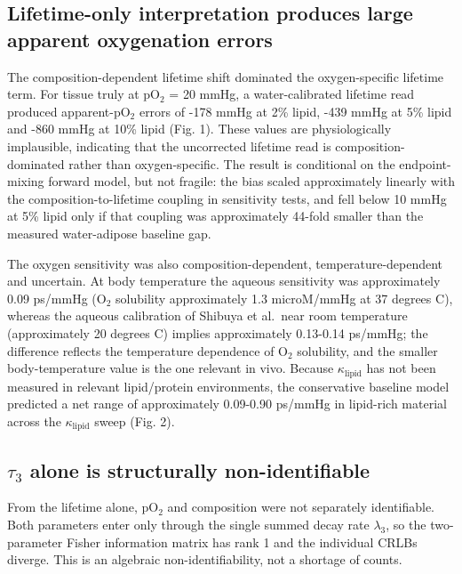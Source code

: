 \documentclass[pdflatex,sn-mathphys-num]{sn-jnl}
\begin{document}
\subsection{Lifetime-only interpretation produces large apparent oxygenation errors}\label{lifetime-only-interpretation-produces-large-apparent-oxygenation-errors}

The composition-dependent lifetime shift dominated the oxygen-specific lifetime term. For tissue truly at pO\(_2\) = 20 mmHg, a water-calibrated lifetime read produced apparent-pO\(_2\) errors of -178 mmHg at 2\% lipid, -439 mmHg at 5\% lipid and -860 mmHg at 10\% lipid (Fig. 1). These values are physiologically implausible, indicating that the uncorrected lifetime read is composition-dominated rather than oxygen-specific. The result is conditional on the endpoint-mixing forward model, but not fragile: the bias scaled approximately linearly with the composition-to-lifetime coupling in sensitivity tests, and fell below 10 mmHg at 5\% lipid only if that coupling was approximately 44-fold smaller than the measured water-adipose baseline gap.

The oxygen sensitivity was also composition-dependent, temperature-dependent and uncertain. At body temperature the aqueous sensitivity was approximately 0.09 ps/mmHg (O\(_2\) solubility approximately 1.3 microM/mmHg at 37 degrees C), whereas the aqueous calibration of Shibuya et al.~near room temperature (approximately 20 degrees C) implies approximately 0.13-0.14 ps/mmHg; the difference reflects the temperature dependence of O\(_2\) solubility, and the smaller body-temperature value is the one relevant in vivo. Because \(\kappa_{\mathrm{lipid}}\) has not been measured in relevant lipid/protein environments, the conservative baseline model predicted a net range of approximately 0.09-0.90 ps/mmHg in lipid-rich material across the \(\kappa_{\mathrm{lipid}}\) sweep (Fig. 2).

\subsection[ tau3 alone is structurally non-identifiable]{\texorpdfstring{$\tau_3$}{tau3} alone is structurally non-identifiable}\label{tau_3-alone-is-structurally-non-identifiable}

From the lifetime alone, pO\(_2\) and composition were not separately identifiable. Both parameters enter only through the single summed decay rate \(\lambda_3\), so the two-parameter Fisher information matrix has rank 1 and the individual CRLBs diverge. This is an algebraic non-identifiability, not a shortage of counts.
\end{document}
